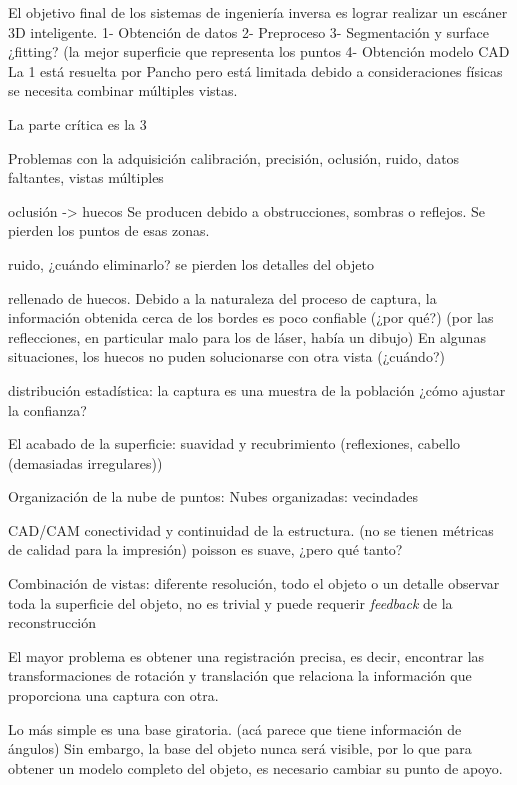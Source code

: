 El objetivo final de los sistemas de ingeniería inversa
es lograr realizar un escáner 3D inteligente.
1- Obtención de datos
2- Preproceso
3- Segmentación y surface ¿fitting? (la mejor superficie que representa los puntos
4- Obtención modelo CAD
La 1 está resuelta por Pancho
	pero está limitada debido a consideraciones físicas
	se necesita combinar múltiples vistas.

La parte crítica es la 3

	Problemas con la adquisición
		calibración, precisión, oclusión, ruido, datos faltantes, vistas múltiples

		oclusión -> huecos
			Se producen debido a obstrucciones, sombras o reflejos.
			Se pierden los puntos de esas zonas.

		ruido, ¿cuándo eliminarlo?
			se pierden los detalles del objeto

		rellenado de huecos.
			Debido a la naturaleza del proceso de captura,
			la información obtenida cerca de los bordes es poco confiable (¿por qué?)
				(por las reflecciones, en particular malo para los de láser, había un dibujo)
			En algunas situaciones, los huecos no puden solucionarse con otra vista (¿cuándo?) 

		distribución estadística: la captura es una muestra de la población
			¿cómo ajustar la confianza?

		El acabado de la superficie:
			suavidad y recubrimiento (reflexiones, cabello (demasiadas irregulares))


	Organización de la nube de puntos:
		Nubes organizadas: vecindades	

	CAD/CAM conectividad y continuidad de la estructura.
		(no se tienen métricas de calidad para la impresión)
		poisson es suave, ¿pero qué tanto?

	Combinación de vistas:
		diferente resolución, todo el objeto o un detalle
		observar toda la superficie del objeto, no es trivial y puede requerir \emph{feedback}
		de la reconstrucción

	El mayor problema es obtener una registración precisa, es decir,
	encontrar las transformaciones de rotación y translación que relaciona la
	información que proporciona una captura con otra.

	Lo más simple es una base giratoria. (acá parece que tiene información de ángulos)
	Sin embargo, la base del objeto nunca
	será visible, por lo que para obtener un modelo completo del objeto, es
	necesario cambiar su punto de apoyo.

